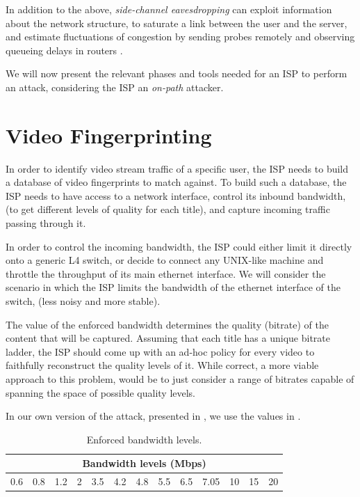 In addition to the above, \emph{side-channel eavesdropping} can exploit
information about the network structure, to saturate a link between the user
and the server, and estimate fluctuations of congestion by sending probes
remotely and observing queueing delays in routers \cite{side_channel}. 

We will now present the relevant phases and tools needed for an ISP to perform
an attack, considering the ISP an \emph{on-path} attacker.

\section{Video Fingerprinting}

In order to identify video stream traffic of a specific user, the ISP needs to
build a database of video fingerprints to match against. To build such a
database, the ISP needs to have access to a network interface, control its
inbound bandwidth, (to get different levels of quality for each title), and
capture incoming traffic passing through it.

In order to control the incoming bandwidth, the ISP could either limit it
directly onto a generic L4 switch, or decide to connect
any UNIX-like machine and throttle the throughput of its main ethernet
interface. We will consider the scenario in which the ISP limits the bandwidth
of the ethernet interface of the switch, (less noisy and more stable).

The value of the enforced bandwidth determines the quality (bitrate) of the
content that will be captured. Assuming that each title has a unique bitrate
ladder, the ISP should come up with an ad-hoc policy for every video to
faithfully reconstruct the quality levels of it. While correct, a more viable
approach to this problem, would be to just consider a range of bitrates capable
of spanning the space of possible quality levels. 

In our own version of the attack, presented in , we use
the values in . 

\begin{table}[htb]
  \centering
  \begin{tabular}{|c|c|c|c|c|c|c|c|c|c|c|c|c|}
    \hline
    \multicolumn{13}{|c|}{\textbf{Bandwidth levels (Mbps)}} \\
    \hline
    0.6 & 0.8 & 1.2 & 2 & 3.5 & 4.2 & 4.8 & 5.5 & 6.5 & 7.05 & 10 & 15 & 20 \\ 
    \hline
  \end{tabular}
  \caption{Enforced bandwidth levels.}
  \label{tab:bandwidths}
\end{table}

